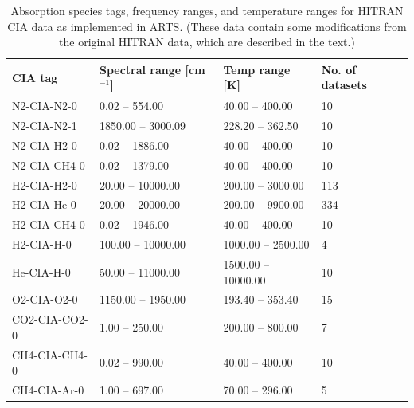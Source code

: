 \begin{description}
\begin{table}
    \caption{Absorption species tags, frequency ranges, and
      temperature ranges for HITRAN CIA data as implemented in
      ARTS. (These data contain some modifications from the original
      HITRAN data, which are described in the text.)} 
    \label{tab:absorption:cia_ranges}
    \centering
    \begin{tabular}{llll}
\hline
    CIA tag& Spectral range [cm$^{-1}$]& Temp range [K]& No. of datasets\\
\hline
  N2-CIA-N2-0& 0.02 -- 554.00& 40.00 -- 400.00& 10\\
  N2-CIA-N2-1& 1850.00 -- 3000.09& 228.20 -- 362.50& 10\\
  N2-CIA-H2-0& 0.02 -- 1886.00& 40.00 -- 400.00& 10\\
  N2-CIA-CH4-0& 0.02 -- 1379.00& 40.00 -- 400.00& 10\\
  H2-CIA-H2-0& 20.00 -- 10000.00& 200.00 -- 3000.00& 113\\
  H2-CIA-He-0& 20.00 -- 20000.00& 200.00 -- 9900.00& 334\\
  H2-CIA-CH4-0& 0.02 -- 1946.00& 40.00 -- 400.00& 10\\
  H2-CIA-H-0& 100.00 -- 10000.00& 1000.00 -- 2500.00& 4\\
  He-CIA-H-0& 50.00 -- 11000.00& 1500.00 -- 10000.00& 10\\
  O2-CIA-O2-0& 1150.00 -- 1950.00& 193.40 -- 353.40& 15\\
  CO2-CIA-CO2-0& 1.00 -- 250.00& 200.00 -- 800.00& 7\\
  CH4-CIA-CH4-0& 0.02 -- 990.00& 40.00 -- 400.00& 10\\
  CH4-CIA-Ar-0& 1.00 -- 697.00& 70.00 -- 296.00& 5\\
\hline
\end{tabular}
\end{table}


\end{description}

